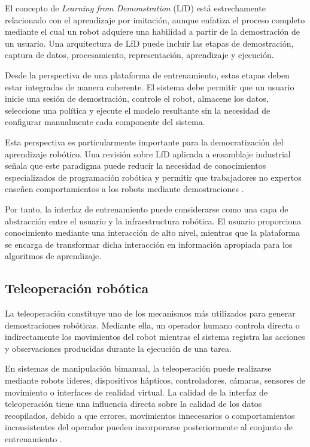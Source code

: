 \documentclass[stu,12pt,floatsintext]{apa7}
\begin{document}
El concepto de \textit{Learning from Demonstration} (LfD) está estrechamente relacionado con el aprendizaje por imitación, aunque enfatiza el proceso completo mediante el cual un robot adquiere una habilidad a partir de la demostración de un usuario. Una arquitectura de LfD puede incluir las etapas de demostración, captura de datos, procesamiento, representación, aprendizaje y ejecución.

Desde la perspectiva de una plataforma de entrenamiento, estas etapas deben estar integradas de manera coherente. El sistema debe permitir que un usuario inicie una sesión de demostración, controle el robot, almacene los datos, seleccione una política y ejecute el modelo resultante sin la necesidad de configurar manualmente cada componente del sistema.

Esta perspectiva es particularmente importante para la democratización del aprendizaje robótico. Una revisión sobre LfD aplicada a ensamblaje industrial señala que este paradigma puede reducir la necesidad de conocimientos especializados de programación robótica y permitir que trabajadores no expertos enseñen comportamientos a los robots mediante demostraciones \parencite{HERNANDEZMORENO2024102658}.

Por tanto, la interfaz de entrenamiento puede considerarse como una capa de abstracción entre el usuario y la infraestructura robótica. El usuario proporciona conocimiento mediante una interacción de alto nivel, mientras que la plataforma se encarga de transformar dicha interacción en información apropiada para los algoritmos de aprendizaje.

\subsection{Teleoperación robótica}

La teleoperación constituye uno de los mecanismos más utilizados para generar demostraciones robóticas. Mediante ella, un operador humano controla directa o indirectamente los movimientos del robot mientras el sistema registra las acciones y observaciones producidas durante la ejecución de una tarea.

En sistemas de manipulación bimanual, la teleoperación puede realizarse mediante robots líderes, dispositivos hápticos, controladores, cámaras, sensores de movimiento o interfaces de realidad virtual. La calidad de la interfaz de teleoperación tiene una influencia directa sobre la calidad de los datos recopilados, debido a que errores, movimientos innecesarios o comportamientos inconsistentes del operador pueden incorporarse posteriormente al conjunto de entrenamiento \parencite{VillalobosRivera2018}.
\end{document}
